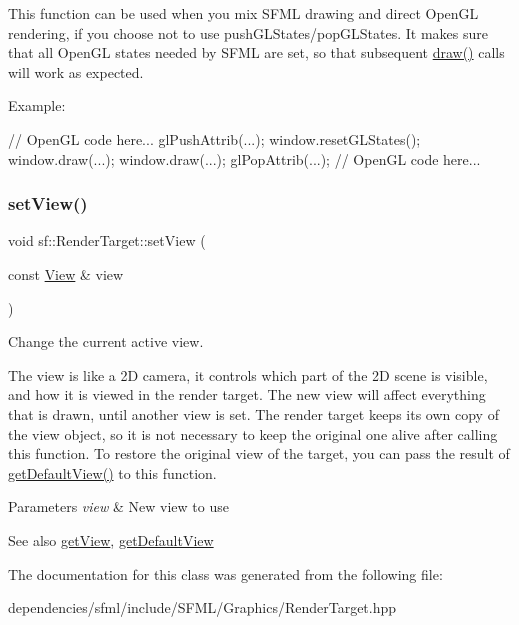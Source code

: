 This function can be used when you mix S\+F\+ML drawing and direct Open\+GL rendering, if you choose not to use push\+G\+L\+States/pop\+G\+L\+States. It makes sure that all Open\+GL states needed by S\+F\+ML are set, so that subsequent \hyperlink{classsf_1_1_render_target_a12417a3bcc245c41d957b29583556f39}{draw()} calls will work as expected.

Example\+: 
\begin{DoxyCode}
\textcolor{comment}{// OpenGL code here...}
glPushAttrib(...);
window.resetGLStates();
window.draw(...);
window.draw(...);
glPopAttrib(...);
\textcolor{comment}{// OpenGL code here...}
\end{DoxyCode}
 \mbox{\label{classsf_1_1_render_target_a063db6dd0a14913504af30e50cb6d946}} 
\subsubsection{\texorpdfstring{set\+View()}{setView()}}
{\footnotesize\ttfamily void sf\+::\+Render\+Target\+::set\+View (\begin{DoxyParamCaption}\item[{const \hyperlink{classsf_1_1_view}{View} \&}]{view }\end{DoxyParamCaption})}



Change the current active view. 

The view is like a 2D camera, it controls which part of the 2D scene is visible, and how it is viewed in the render target. The new view will affect everything that is drawn, until another view is set. The render target keeps its own copy of the view object, so it is not necessary to keep the original one alive after calling this function. To restore the original view of the target, you can pass the result of \hyperlink{classsf_1_1_render_target_ad3b533c3f899d7044d981ed607aef9be}{get\+Default\+View()} to this function.


\begin{DoxyParams}{Parameters}
{\em view} & New view to use\\
\hline
\end{DoxyParams}
\begin{DoxySeeAlso}{See also}
\hyperlink{classsf_1_1_render_target_a2c179503b4dcdf5282ef6426d317602c}{get\+View}, \hyperlink{classsf_1_1_render_target_ad3b533c3f899d7044d981ed607aef9be}{get\+Default\+View} 
\end{DoxySeeAlso}


The documentation for this class was generated from the following file\+:\begin{DoxyCompactItemize}
\item 
dependencies/sfml/include/\+S\+F\+M\+L/\+Graphics/Render\+Target.\+hpp\end{DoxyCompactItemize}

